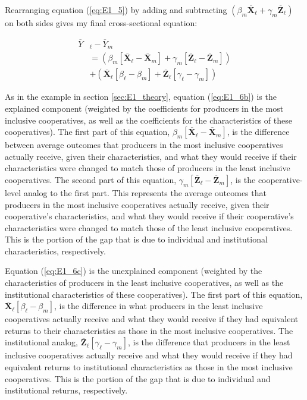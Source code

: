\documentclass[11pt]{article}
\begin{document}
Rearranging equation (\ref{eq:E1_5}) by adding and subtracting $(\beta_{m}\overline{\mathbf{X}}_{\ell} + \gamma_{m}\overline{\mathbf{Z}}_{\ell})$ on both sides gives my final cross-sectional equation:

\begin{subequations}
    \begin{align}
        \overline{Y}&_{\ell} - \overline{Y}_{m} \label{eq:E1_6a} \\
        &= (\beta_{m}[\overline{\mathbf{X}}_{\ell} - \overline{\mathbf{X}}_{m}] + \gamma_{m}[\overline{\mathbf{Z}}_{\ell} - \overline{\mathbf{Z}}_{m}]) \label{eq:E1_6b} \\
        &+ (\overline{\mathbf{X}}_{\ell}[\beta_{\ell} - \beta_{m}] + \overline{\mathbf{Z}}_{\ell}[\gamma_{\ell} - \gamma_{m}]) \label{eq:E1_6c}
    \end{align}
\end{subequations}  

As in the example in section \ref{sec:E1_theory}, equation (\ref{eq:E1_6b}) is the explained component (weighted by the coefficients for producers in the most inclusive cooperatives, as well as the coefficients for the characteristics of these cooperatives). The first part of this equation, $\beta_{m}[\overline{\mathbf{X}}_{\ell} - \overline{\mathbf{X}}_{m}]$, is the difference between average outcomes that producers in the most inclusive cooperatives actually receive, given their characteristics, and what they would receive if their characteristics were changed to match those of producers in the least inclusive cooperatives. The second part of this equation, $\gamma_{m}[\overline{\mathbf{Z}}_{\ell} - \overline{\mathbf{Z}}_{m}]$, is the cooperative-level analog to the first part. This represents the average outcomes that producers in the most inclusive cooperatives actually receive, given their cooperative's characteristics, and what they would receive if their cooperative's characteristics were changed to match those of the least inclusive cooperatives. This is the portion of the gap that is due to individual and institutional characteristics, respectively.

Equation (\ref{eq:E1_6c}) is the unexplained component (weighted by the characteristics of producers in the least inclusive cooperatives, as well as the institutional characteristics of these cooperatives). The first part of this equation, $\overline{\mathbf{X}}_{\ell}[\beta_{\ell} - \beta_{m}]$, is the difference in what producers in the least inclusive cooperatives actually receive and what they would receive if they had equivalent returns to their characteristics as those in the most inclusive cooperatives. The institutional analog, $\overline{\mathbf{Z}}_{\ell}[\gamma_{\ell} - \gamma_{m}]$, is the difference that producers in the least inclusive cooperatives actually receive and what they would receive if they had equivalent returns to institutional characteristics as those in the most inclusive cooperatives. This is the portion of the gap that is due to individual and institutional returns, respectively. \\
\end{document}
